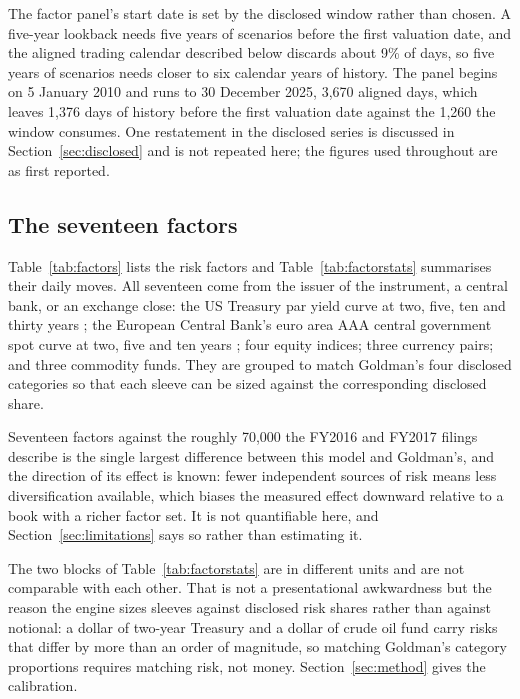 The factor panel's start date is set by the disclosed window rather than
chosen. A five-year lookback needs five years of scenarios before the first
valuation date, and the aligned trading calendar described below discards about
9\% of days, so five years of scenarios needs closer to six calendar years of
history. The panel begins on 5 January 2010 and runs to 30 December 2025,
3,670 aligned days, which leaves 1,376 days of history before the first
valuation date against the 1,260 the window consumes. One restatement in the
disclosed series is discussed in Section~\ref{sec:disclosed} and is not
repeated here; the figures used throughout are as first reported.

\subsection{The seventeen factors}

Table~\ref{tab:factors} lists the risk factors and Table~\ref{tab:factorstats}
summarises their daily moves. All seventeen come from the issuer of the
instrument, a central bank, or an exchange close: the US Treasury par yield
curve at two, five, ten and thirty years \citep{treasurycurve}; the European
Central Bank's euro area AAA central government spot curve at two, five and ten
years \citep{ecbcurve}; four equity indices; three currency pairs; and three
commodity funds. They are grouped to match Goldman's four disclosed categories
so that each sleeve can be sized against the corresponding disclosed share.





Seventeen factors against the roughly 70,000 the FY2016 and FY2017 filings
describe is the single largest difference between this model and Goldman's, and
the direction of its effect is known: fewer independent sources of risk means
less diversification available, which biases the measured effect downward
relative to a book with a richer factor set. It is not quantifiable here, and
Section~\ref{sec:limitations} says so rather than estimating it.

The two blocks of Table~\ref{tab:factorstats} are in different units and are
not comparable with each other. That is not a presentational awkwardness but
the reason the engine sizes sleeves against disclosed risk shares rather than
against notional: a dollar of two-year Treasury and a dollar of crude oil fund
carry risks that differ by more than an order of magnitude, so matching
Goldman's category proportions requires matching risk, not money.
Section~\ref{sec:method} gives the calibration.

